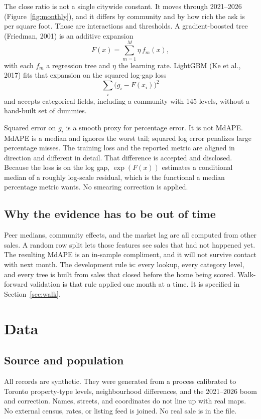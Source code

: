 \documentclass[11pt]{article}
\begin{document}
The close ratio is not a single citywide constant. It moves through 2021--2026 (Figure~\ref{fig:monthly}), and it differs by community and by how rich the ask is per square foot. Those are interactions and thresholds. A gradient-boosted tree (Friedman, 2001) is an additive expansion
\[
F(x) = \sum_{m=1}^{M} \eta \, f_m(x),
\]
with each \(f_m\) a regression tree and \(\eta\) the learning rate. LightGBM (Ke et al., 2017) fits that expansion on the squared log-gap loss
\[
\sum_i \bigl(g_i - F(x_i)\bigr)^2
\]
and accepts categorical fields, including a community with 145 levels, without a hand-built set of dummies.

Squared error on \(g_i\) is a smooth proxy for percentage error. It is not MdAPE. MdAPE is a median and ignores the worst tail; squared log error penalizes large percentage misses. The training loss and the reported metric are aligned in direction and different in detail. That difference is accepted and disclosed. Because the loss is on the log gap, \(\exp(F(x))\) estimates a conditional median of a roughly log-scale residual, which is the functional a median percentage metric wants. No smearing correction is applied.

\subsection{Why the evidence has to be out of time}

Peer medians, community effects, and the market lag are all computed from other sales. A random row split lets those features see sales that had not happened yet. The resulting MdAPE is an in-sample compliment, and it will not survive contact with next month. The development rule is: every lookup, every category level, and every tree is built from sales that closed before the home being scored. Walk-forward validation is that rule applied one month at a time. It is specified in Section~\ref{sec:walk}.

\section{Data}
\label{sec:data}

\subsection{Source and population}

All records are synthetic. They were generated from a process calibrated to Toronto property-type levels, neighbourhood differences, and the 2021--2026 boom and correction. Names, streets, and coordinates do not line up with real maps. No external census, rates, or listing feed is joined. No real sale is in the file.
\end{document}
